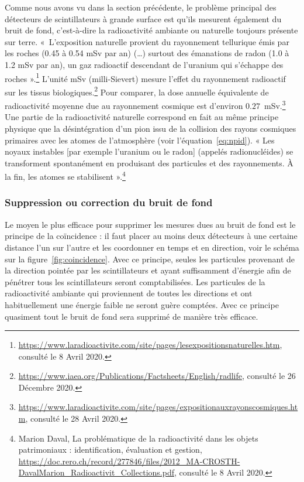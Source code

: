 \documentclass[a4paper, 12pt]{article}
\begin{document}
\begin{spacing}{1.5}
Comme nous avons vu dans la section précédente, le problème principal des détecteurs de scintillateurs à grande surface est qu'ils mesurent également du bruit de fond, c'est-à-dire la radioactivité ambiante ou naturelle toujours présente sur terre. «~L'exposition naturelle provient du rayonnement tellurique émis par les roches (0.45 à 0.54 mSv par an) (…) surtout des émanations de radon (1.0 à 1.2 mSv par an), un gaz radioactif descendant de l'uranium qui s'échappe des roches ».\footnote{\url{https://www.laradioactivite.com/site/pages/lesexpositionsnaturelles.htm}, consulté le 8 Avril 2020.} L'unité mSv (milli-Sievert) mesure l'effet du rayonnement radioactif sur les tissus biologiques.\footnote{\url{https://www.iaea.org/Publications/Factsheets/English/radlife}, consulté le 26 Décembre 2020.} Pour comparer, la dose annuelle équivalente de radioactivité moyenne due au rayonnement cosmique est d'environ $0.27$~mSv.\footnote{\url{https://www.laradioactivite.com/site/pages/expositionauxrayonscosmiques.htm}, consulté le 28 Avril 2020.} Une partie de la radioactivité naturelle correspond en fait au même principe physique que la désintégration d'un pion issu de la collision des rayons cosmiques primaires avec les atomes de l'atmosphère (voir l'équation~\ref{eq:npid}). « Les noyaux instables [par exemple l'uranium ou le radon] (appelés radionucléides) se transforment spontanément en produisant des particules et des rayonnements. À la fin, les atomes se stabilisent ».\footnote{Marion Daval, La problématique de la radioactivité dans les objets patrimoniaux : identification, évaluation et gestion, \url{https://doc.rero.ch/record/277846/files/2012_MA-CROSTH-DavalMarion_Radioactivit_Collections.pdf}, consulté le 8 Avril 2020.} 

\subsubsection{Suppression ou correction du bruit de fond}
\label{sec:bdfcs}

Le moyen le plus efficace pour supprimer les mesures dues au bruit de fond est le principe de la coïncidence : il faut placer au moins deux détecteurs à une certaine distance l'un sur l’autre et les coordonner en temps et en direction, voir le schéma sur la figure~\ref{fig:coincidence}. Avec ce principe, seules les particules provenant de la direction pointée par les scintillateurs et ayant suffisamment d'énergie afin de pénétrer tous les scintillateurs seront comptabilisées. Les particules de la radioactivité ambiante qui proviennent de toutes les directions et ont habituellement une énergie faible ne seront guère comptées. Avec ce principe quasiment tout le bruit de fond sera supprimé de manière très efficace.


\end{spacing}
\end{document}

